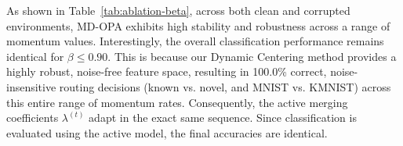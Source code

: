 \documentclass{article}
\theoremstyle{plain}
\theoremstyle{definition}
\theoremstyle{remark}
\begin{document}
\begin{table}[h]
\caption{Sensitivity sweep of the momentum parameter $\beta$ in MD-OPA under clean and Gaussian noise sequential streams.}
\label{tab:ablation-beta}
\begin{center}
\begin{small}
\begin{sc}
\end{sc}
\end{small}
\end{center}
\end{table}

As shown in Table~\ref{tab:ablation-beta}, across both clean and corrupted environments, MD-OPA exhibits high stability and robustness across a range of momentum values. Interestingly, the overall classification performance remains identical for $\beta \le 0.90$. This is because our Dynamic Centering method provides a highly robust, noise-free feature space, resulting in 100.0\% correct, noise-insensitive routing decisions (known vs. novel, and MNIST vs. KMNIST) across this entire range of momentum rates. Consequently, the active merging coefficients $\lambda^{(t)}$ adapt in the exact same sequence. Since classification is evaluated using the active model, the final accuracies are identical.
\end{document}

